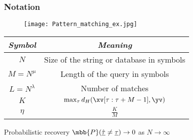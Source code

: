 \begin{frame}\frametitle{Notation}

	\begin{figure}[t]
		\centering
		\texttt{[image: Pattern\_matching\_ex.jpg]}
	\end{figure}
	\vspace{-8pt}
	{\small
	\begin{table}[h!]
		\label{Table:Notations}
		\begin{center}
			\begin{tabular}{|c|c|} 	
				\hline		
				\textit{Symbol}		&  \textit{Meaning} \\		
				\hline
				$N$           		& Size of the string or database in symbols \\
				\hline
				$M = N^{\mu}$       & Length of the query in symbols \\
				\hline
				$L = N^\lambda$    &   Number of matches \\
				\hline
				$K$             &$\max_{\tau}d_{H}(\xv[\tau:\tau+M-1],\yv)$\\
				\hline
				$\eta$             &$\frac{K}{M}$\\
				\hline
			\end{tabular}
		\end{center}
	\end{table}
    }
    \begin{block}{Probabilistic recovery}
    $\mbb{P}(\hat{\underline{\tau}} \neq \underline{\tau}) \rightarrow 0$ as $N \rightarrow \infty$
    \end{block}
	\end{frame}	
	
